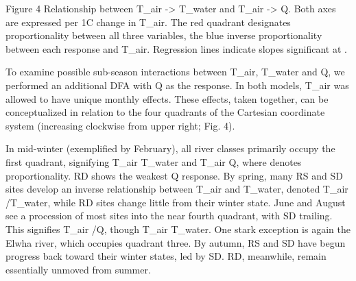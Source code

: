\begin{center}
\end{center}
Figure 4 Relationship between T_{air} -> T_{water} and T_{air} -> Q. Both axes are expressed per 1\degree C change in T_{air}. The red quadrant designates proportionality between all three variables, the blue inverse proportionality between each response and T_{air}. Regression lines indicate slopes significant at .

To examine possible sub-season interactions between T_air, T_water and Q, we performed an additional DFA with Q as the response. In both models, T_air was allowed to have unique monthly effects. These effects, taken together, can be conceptualized in relation to the four quadrants of the Cartesian coordinate system (increasing clockwise from upper right; Fig. 4).

In mid-winter (exemplified by February), all river classes primarily occupy the first quadrant, signifying T_air \propto T_water and T_air \propto Q, where \propto denotes proportionality. RD shows the weakest Q response. By spring, many RS and SD sites develop an inverse relationship between T_air and T_water, denoted T_air /T_water, while RD sites change little from their winter state. June and August see a procession of most sites into the near fourth quadrant, with SD trailing. This signifies T_air /Q, though T_air \propto T_water. One stark exception is again the Elwha river, which occupies quadrant three. By autumn, RS and SD have begun progress back toward their winter states, led by SD. RD, meanwhile, remain essentially unmoved from summer.

